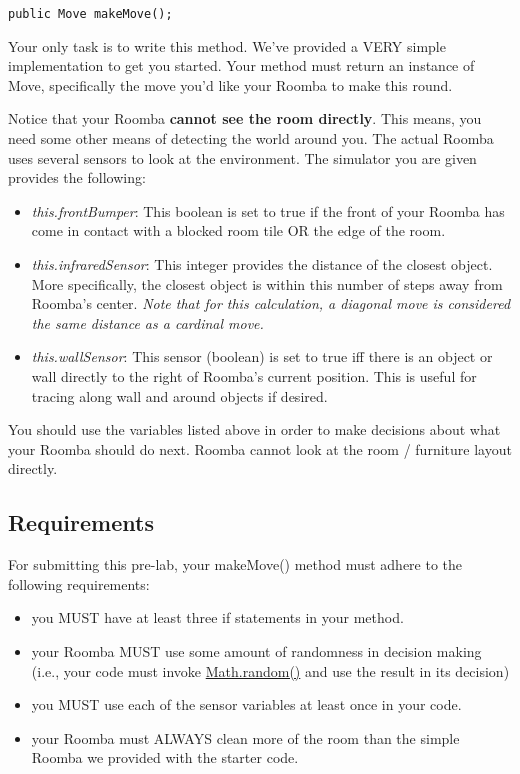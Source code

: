 \documentclass[paper=a4, fontsize=11pt, parskip=full]{scrartcl} %
\numberwithin{equation}{section} %
\numberwithin{figure}{section} %
\numberwithin{table}{section} %
\begin{document}
\begin{lstlisting}
public Move makeMove();
\end{lstlisting}

Your only task is to write this method. We've provided a VERY simple implementation to get you started. Your method must return an instance of Move, specifically the move you'd like your Roomba to make this round.

Notice that your Roomba \textbf{cannot see the room directly}. This means, you need some other means of detecting the world around you. The actual Roomba uses several sensors to look at the environment. The simulator you are given provides the following:

\begin{itemize}
\item \emph{this.frontBumper}: This boolean is set to true if the front of your Roomba has come in contact with a blocked room tile OR the edge of the room.
\item \emph{this.infraredSensor}: This integer provides the distance of the closest object. More specifically, the closest object is within this number of steps away from Roomba's center. \emph{Note that for this calculation, a diagonal move is considered the same distance as a cardinal move.}
\item \emph{this.wallSensor}: This sensor (boolean) is set to true iff there is an object or wall directly to the right of Roomba's current position. This is useful for tracing along wall and around objects if desired.
\end{itemize}

You should use the variables listed above in order to make decisions about what your Roomba should do next. Roomba cannot look at the room / furniture layout directly.

\subsection{Requirements}

For submitting this pre-lab, your makeMove() method must adhere to the following requirements:

\begin{itemize}
	\item you MUST have at least three if statements in your method.
	\item your Roomba MUST use some amount of randomness in decision making (i.e., your code must invoke \href{https://docs.oracle.com/javase/8/docs/api/java/lang/Math.html#random--}{Math.random()} and use the result in its decision)
	\item you MUST use each of the sensor variables at least once in your code.
	\item your Roomba must ALWAYS clean more of the room than the simple Roomba we provided with the starter code.
\end{itemize}
\newpage
\end{document}
